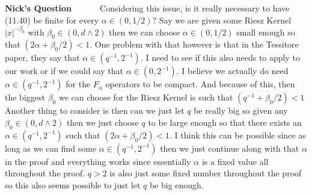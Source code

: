 \documentclass[a4paper,11pt]{article}
\theoremstyle{plain}
\theoremstyle{definition}
\newcounter{NQ}
\newenvironment{NickQuestion}[1][] %
  {\refstepcounter{NQ}
  \begin{mdframed}[backgroundcolor=lightgray]\textbf{Nick's Question \theNQ \: #1~~}~~~\noindent}%
  {\end{mdframed}}
\numberwithin{NQ}{section}
\numberwithin{LQ}{section}
\numberwithin{ZQ}{section}
\begin{document}
\begin{NickQuestion}
Considering this issue, is it really necessary to have (11.40) be finite for every $\alpha \in (0,1/2)$? Say we are given some Riesz Kernel $|x|^{-\beta_0}$ with $\beta_0 \in (0,d \wedge 2)$ then we can choose $\alpha \in (0,1/2)$ small enough so that $(2\alpha +\beta_0/2)<1$. One problem with that however is that in the Tessitore paper, they say that $\alpha \in (q^{-1},2^{-1})$. I need to see if this also needs to apply to our work or if we could say that $\alpha \in (0,2^{-1})$. I believe we actually do need $\alpha \in (q^{-1},2^{-1})$ for the $F_\alpha$ operators to be compact. And because of this, then the biggest $\beta_0$ we can choose for the Riesz Kernel is such that $(q^{-1}+\beta_0/2) <1$\\

Another thing to consider is then can we just let $q$ be really big so given any $\beta_0\in(0,d \wedge 2)$ then we just choose $q$ to be large enough so that there exists an $\alpha \in (q^{-1},2^{-1})$ such that $(2\alpha +\beta_0/2)<1$. I think this can be possible since as long as we can find some $\alpha \in (q^{-1},2^{-1})$ then we just continue along with that $\alpha$ in the proof and everything works since essentially $\alpha$ is a fixed value all throughout the proof. $q>2$ is also just some fixed number throughout the proof so this also seems possible to just let $q$ be big enough.
\end{NickQuestion}
\end{document}
